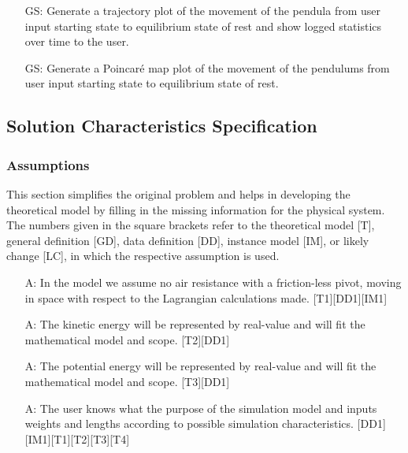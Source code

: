 \documentclass[12pt]{article}
\newcounter{assumpnum} %
\newcounter{goalnum} %
\begin{document}
\begin{itemize}
\item[GS\refstepcounter{goalnum}\thegoalnum:] Generate a trajectory plot of 
the movement of the pendula from user input starting state to equilibrium 
state of rest and show logged statistics over time to the user. 
\item[GS\refstepcounter{goalnum}\thegoalnum:] Generate a Poincaré map plot of 
the movement of the pendulums from user input starting state to equilibrium 
state of rest.
\end{itemize}


\newpage

\subsection{Solution Characteristics Specification}

\subsubsection{Assumptions}

This section simplifies the original problem and helps in developing the
theoretical model by filling in the missing information for the physical
system. The numbers given in the square brackets refer to the theoretical model
[T], general definition [GD], data definition [DD], instance model [IM], or
likely change [LC], in which the respective assumption is used.

\begin{itemize}
\item[A\refstepcounter{assumpnum}\theassumpnum \label{A:equation}:]
In the model we assume no air resistance with a friction-less pivot, moving in
space with respect to the Lagrangian calculations made. [T1][DD1][IM1] 
\item[A\refstepcounter{assumpnum}\theassumpnum \label{A:kinetic}:]
  The kinetic energy will be represented by real-value and will fit the 
mathematical model and scope. [T2][DD1]
\item[A\refstepcounter{assumpnum}\theassumpnum \label{A:poten}:]
  The potential energy will be represented by real-value and will fit the 
mathematical model and scope. [T3][DD1]
\item[A\refstepcounter{assumpnum}\theassumpnum \label{A:init-user}:]
The user knows what the purpose of the simulation model and inputs weights and 
lengths according to possible simulation characteristics. 
[DD1][IM1][T1][T2][T3][T4]
\end{itemize}
\end{document}
